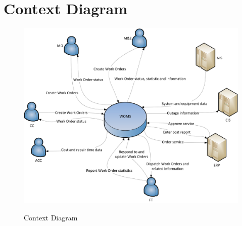\appendix
\section{Context Diagram}
\begin{figure}[!h]
	\vspace{1cm}
	\centering
	\includegraphics[scale = 0.9, angle = 90]{images/context_diagram.png}
	\label{appendix_a_context_diagram}
	\caption{Context Diagram}
\end{figure}
